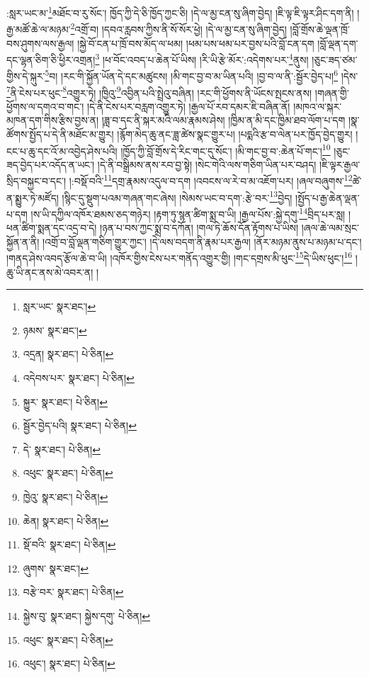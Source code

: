 :སླར་ཡང་མ་\footnote{སླར་ཡང་  སྣར་ཐང་། }མཐོང་བ་རུ་སོང་། ཁྱོད་ཀྱི་དེ་ཅི་ཁྱོད་ཀྱང་ཅི། །དེ་ལ་མྱ་ངན་སུ་ཞིག་བྱེད། །ཇི་ལྟ་ཇི་ལྟར་ཤིང་དག་ནི། །རྒྱ་མཚོ་ཆེ་ལ་མཉམ་\footnote{ཉམས་  སྣར་ཐང་། }འགྲོ་བ། །དབའ་རླབས་ཀྱིས་ནི་སོ་སོར་ཕྱེ། །དེ་ལ་མྱ་ངན་སུ་ཞིག་བྱེད། །བློ་གྲོས་ཆེ་ལྡན་ཁྲོ་བས་ཤུགས་ལས་རྒྱལ། །སྐྱེ་བོ་ངན་པ་ཁྲོ་བས་མོད་ལ་ཕམ། །ཕམ་པས་ཕམ་པར་བྱས་པའི་བློ་ངན་དག །བློ་ལྡན་དག་དང་ལྷན་ཅིག་ཅི་ཕྱིར་འགྲན།\footnote{འདྲན།  སྣར་ཐང་།  པེ་ཅིན། } །ཕ་བོང་འབད་པ་ཆེན་པོ་ཡིས། །རི་ཡི་རྩེ་མོར་:འདེགས་པར་\footnote{འདེབས་པར་  སྣར་ཐང་།  པེ་ཅིན། }ནུས། །ཅུང་ཟད་ཙམ་གྱིས་དེ་སྐུར་\footnote{སྐྱུར་  སྣར་ཐང་།  པེ་ཅིན། }བ། །རང་གི་སྐྱོན་ཡོན་དེ་དང་མཚུངས། །མི་གང་བྱ་བ་མ་ཡིན་པའི། །བྱ་བ་ལ་ནི་:སྦྱོར་བྱེད་པ།\footnote{སྦྱོར་བྱེད་པའི།  སྣར་ཐང་།  པེ་ཅིན། } །དེས་\footnote{དེ་  སྣར་ཐང་།  པེ་ཅིན། }ནི་ངེས་པར་ཕུང་\footnote{འཕུང་  སྣར་ཐང་།  པེ་ཅིན། }འགྱུར་ཏེ། །ཁྱིའུ་\footnote{ཁྱེའུ་  སྣར་ཐང་།  པེ་ཅིན། }འབྱིན་པའི་སྤྲེའུ་བཞིན། །རང་གི་ཕྱོགས་ནི་ཡོངས་སྤངས་ནས། །གཞན་གྱི་ཕྱོགས་ལ་དགའ་བ་གང་། །དེ་ནི་ངེས་པར་བརླག་འགྱུར་ཏེ། །རྒྱལ་པོ་རབ་དམར་ཇི་བཞིན་ནོ། །མཁའ་ལ་སྐར་མཁན་དག་གིས་རྩིས་བྱས་ན། །ཟླ་བ་དང་ནི་སྐར་མའི་ལམ་རྣམས་ཤེས། །ཁྱིམ་ན་མི་དང་ཁྱིམ་ཐབ་ལོག་པ་དག །སྣ་ཚོགས་སྤྱོད་པ་དེ་ནི་མཐོང་མ་གྱུར། །རྙོག་མེད་ཆུ་ནང་ཟླ་ཚེས་སྣང་གྱུར་པ། །པདྨའི་རྩ་བ་ལེན་པར་ཁྱོད་བྱེད་གྱུར། །ངང་པ་ཆུ་དང་འོ་མ་འབྱེད་ཤེས་པའི། །ཁྱོད་ཀྱི་བློ་གྲོས་དེ་རིང་གང་དུ་སོང་། །མི་གང་བྱ་བ་:ཆེན་པོ་གང་།\footnote{ཆེན།  སྣར་ཐང་།  པེ་ཅིན། } །ཅུང་ཟད་བྱེད་པར་འདོད་ན་ཡང་། །དེ་ནི་བསྒྲིམས་ནས་རབ་བྱ་སྟེ། །སེང་གེའི་ལས་གཅིག་ཡིན་པར་བཤད། །ཇི་ལྟར་རྒྱལ་སྲིད་བསྐྱང་བ་དང་། །:བསྡོ་བའི་\footnote{སྡོ་བའི་  སྣར་ཐང་།  པེ་ཅིན། }དགྲ་རྣམས་འདུལ་བ་དག །འབངས་ལ་རེ་བ་མ་འཇོག་པར། །ཞལ་བཞུགས་\footnote{ཞུགས་  སྣར་ཐང་། }ཚེ་ན་སྨྱུར་ཏེ་མཛོད། །སྙིང་དུ་སྡུག་པའམ་གཞན་གང་ཞེས། །སེམས་ཡང་བ་དག་:རྩེ་བར་\footnote{བརྩེ་བར་  སྣར་ཐང་།  པེ་ཅིན། }བྱེད། །སྤྱོད་པ་རྒྱ་ཆེན་ལྡན་པ་དག །ས་ཡི་དཀྱིལ་འཁོར་ཐམས་ཅད་གཉེར། །རྟག་ཏུ་སྙན་ཚིག་སྨྲ་བ་ཡི། །རྒྱལ་པོས་:སྐྱེ་དགུ་\footnote{སྐྱེས་བུ་  སྣར་ཐང་། སྐྱེས་དགུ་  པེ་ཅིན། }བྲིད་པར་སླ། །ཕན་ཚིག་སྨན་དང་འདྲ་བ་དེ། །ཉན་པ་བས་ཀྱང་སྨྲ་བ་དཀོན། །གལ་ཏེ་ཆོས་དོན་རྟོགས་པ་ཡིས། །ཞལ་ཆེ་ལམ་སྲང་སྐྱོན་ན་ནི། །འགྲོ་བ་བློ་ལྡན་གཅིག་གྱུར་ཀྱང་། །དེ་ལས་བདག་ནི་རྣམ་པར་རྒྱལ། །ནོར་མཉམ་ནུས་པ་མཉམ་པ་དང་། །གནད་ཤེས་འབད་རྩོལ་ཆེ་བ་ཡི། །འཁོར་གྱིས་ངེས་པར་གནོད་འགྱུར་གྱི། །གང་དགྲས་མི་ཕུང་\footnote{འཕུང་  སྣར་ཐང་།  པེ་ཅིན། }དེ་ཡིས་ཕུང་།\footnote{འཕུང་།  སྣར་ཐང་།  པེ་ཅིན། } །ཆུ་ཡི་ནང་ནས་མེ་འབར་ན། །
